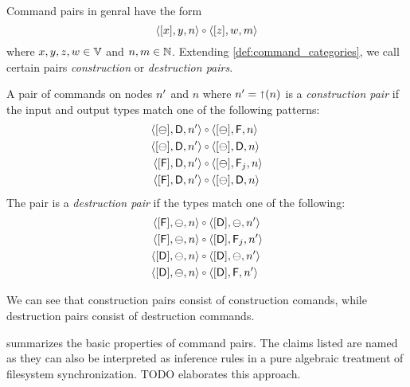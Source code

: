 \myskip
Command pairs in genral have the form
\[ \cxynv\cc  \czwmv \]
where $x,y,z,w\in\mathbb{V}$ and $n,m\in\mathbb{N}$. 
Extending \cref{def:command_categories}, we call certain pairs
\emph{construction} or \emph{destruction pairs}.

\begin{mydef}
A pair of commands on nodes $n'$ and $n$ where $n'=\mathord{\shortuparrow}({n})$
is a \emph{construction pair} if the input and output types match
one of the following patterns:
   \begin{align*}
            \cbda{\nn}&\cc  \cbfa{n} \\
            \cbda{\nn}&\cc  \cbda{n} \\
            \cfda{\nn}&\cc  \caaa{\empt}{\valff}{n} \\
            \cfda{\nn}&\cc  \cbda{n}
   \end{align*}
The pair is a \emph{destruction pair} if the types match one of the following:
   \begin{align*}
            \cfba{n}&\cc  \cdba{\nn} \\
            \cfba{n}&\cc  \caaa{\vald}{\valff}{\nn} \\
            \cdba{n}&\cc  \cdba{\nn} \\
            \cdba{n}&\cc  \cdfa{\nn}
   \end{align*}
\end{mydef}

We can see that construction pairs consist of construction comands,
while destruction pairs consist of destruction commands.




 summarizes the basic properties of command pairs.
The claims listed are named \emph{}
as they can also be interpreted as inference rules in a pure
algebraic treatment of filesystem synchronization.
TODO elaborates this approach.


